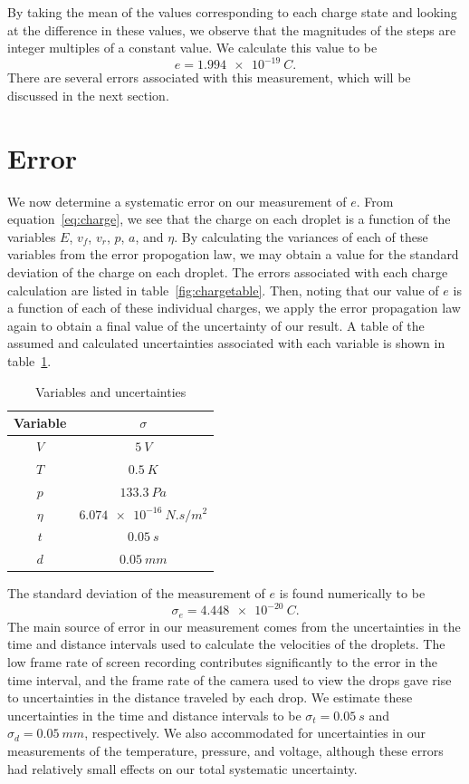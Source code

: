 \documentclass[aps, reprint,amsmath,amssymb]{revtex4-1} %
\begin{document}
By taking the mean of the values corresponding to each charge state and looking at the difference in these values, we observe that the magnitudes of the steps are integer multiples of a constant value. We calculate this value to be 
\[
    e = \SI{1.994e-19}{C}.
\]
There are several errors associated with this measurement, which will be
discussed in the next section.

\section{Error}
We now determine a systematic error on our measurement of $e$. From
equation~\eqref{eq:charge}, we see that the charge on each droplet is a function of the variables $E$, $v_f$, $v_r$, $p$, $a$, and $\eta$. By calculating the variances of each of these variables from the error propogation law, we may obtain a value for the standard deviation of the charge on each droplet. The errors associated with each charge calculation are listed in table~\ref{fig:chargetable}. Then, noting that our value of $e$ is a function of each of these individual charges, we apply the error propagation law again to obtain a final value of the uncertainty of our result. A table of the assumed and calculated uncertainties associated with each variable is shown in table~\ref{fig:errors}.
\begin{table}
\begin{tabular}{ |c|c| } 
 \hline
 Variable & $\sigma$ \\ \hline\hline
$V$ & $\SI{5}{V}$ \\
$T$ & $\SI{0.5}{K}$ \\
$p$ & $\SI{133.3}{Pa}$ \\
$\eta$ & $\SI{6.074e-16}{N.s/m^2}$ \\
$t$ & $\SI{0.05}{s}$ \\
$d$ & $\SI{0.05}{mm}$ \\ \hline
\end{tabular}
\caption{Variables and uncertainties}
\label{fig:errors}
\end{table}

The standard deviation of the measurement of $e$ is found numerically to be
\[
    \sigma_e = \SI{4.448e-20}{C}.
\]
The main source of error in our measurement comes from the uncertainties in the time and distance intervals used to calculate the velocities of the droplets. The low frame rate of screen recording contributes significantly to the error in the time interval, and the frame rate of the camera used to view the drops gave rise to uncertainties in the distance traveled by each drop. We estimate these uncertainties in the time and distance intervals to be $\sigma_t = \SI{0.05}{s}$ and $\sigma_d = \SI{0.05}{mm}$, respectively. We also accommodated for uncertainties in our measurements of the temperature, pressure, and voltage, although these errors had relatively small effects on our total systematic uncertainty.
\end{document}
